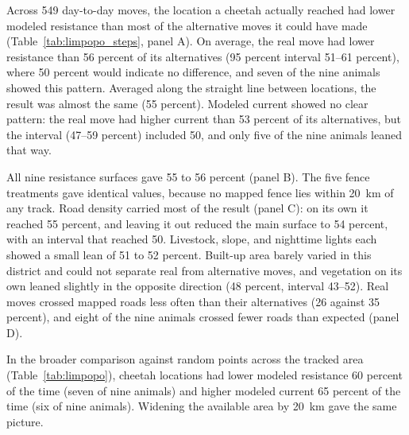 Across 549 day-to-day moves, the location a cheetah actually reached had lower modeled resistance than most of the alternative moves it could have made (Table~\ref{tab:limpopo_steps}, panel A). On average, the real move had lower resistance than 56 percent of its alternatives (95 percent interval 51--61 percent), where 50 percent would indicate no difference, and seven of the nine animals showed this pattern. Averaged along the straight line between locations, the result was almost the same (55 percent). Modeled current showed no clear pattern: the real move had higher current than 53 percent of its alternatives, but the interval (47--59 percent) included 50, and only five of the nine animals leaned that way.

All nine resistance surfaces gave 55 to 56 percent (panel B). The five fence treatments gave identical values, because no mapped fence lies within 20~km of any track. Road density carried most of the result (panel C): on its own it reached 55 percent, and leaving it out reduced the main surface to 54 percent, with an interval that reached 50. Livestock, slope, and nighttime lights each showed a small lean of 51 to 52 percent. Built-up area barely varied in this district and could not separate real from alternative moves, and vegetation on its own leaned slightly in the opposite direction (48 percent, interval 43--52). Real moves crossed mapped roads less often than their alternatives (26 against 35 percent), and eight of the nine animals crossed fewer roads than expected (panel D).

In the broader comparison against random points across the tracked area (Table~\ref{tab:limpopo}), cheetah locations had lower modeled resistance 60 percent of the time (seven of nine animals) and higher modeled current 65 percent of the time (six of nine animals). Widening the available area by 20~km gave the same picture.

\begin{table}[htbp]\centering
  \caption{Day-to-day moves of nine free-ranging cheetahs (Limpopo, 2003--2008) compared with moves of the same length the animals could have made instead, on the 2012 surfaces. Panels show the main surface, all nine surfaces, single input layers, and road crossings.}
  \label{tab:limpopo_steps}
  
\end{table}

\begin{table}[htbp]\centering
  \caption{Modeled resistance and current at daily locations of nine free-ranging cheetahs (Limpopo, 2003--2008) compared with random available points from the same landscape, on the 2012 surfaces. This is the broader, less strict comparison.}
  \label{tab:limpopo}
  
\end{table}

